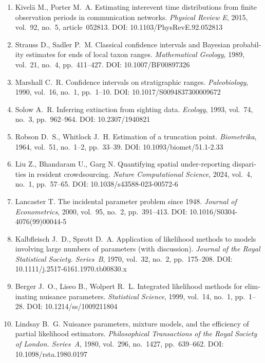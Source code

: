 \documentclass[11pt,a4paper]{article}
\theoremstyle{plain}
\theoremstyle{remark}
\begin{document}
\begin{otherlanguage}{english}
\begin{enumerate}
\item Kivel\"{a} M., Porter M.~A. Estimating interevent time distributions
from finite observation periods in communication networks.
\emph{Physical Review E}, 2015, vol.~92, no.~5, article~052813.
DOI: 10.1103/PhysRevE.92.052813

\item Strauss D., Sadler P.~M. Classical confidence intervals and Bayesian
probability estimates for ends of local taxon ranges. \emph{Mathematical
Geology}, 1989, vol.~21, no.~4, pp.~411--427. DOI: 10.1007/BF00897326

\item Marshall C.~R. Confidence intervals on stratigraphic ranges.
\emph{Paleobiology}, 1990, vol.~16, no.~1, pp.~1--10.
DOI: 10.1017/S0094837300009672

\item Solow A.~R. Inferring extinction from sighting data. \emph{Ecology},
1993, vol.~74, no.~3, pp.~962--964. DOI: 10.2307/1940821

\item Robson D.~S., Whitlock J.~H. Estimation of a truncation point.
\emph{Biometrika}, 1964, vol.~51, no.~1--2, pp.~33--39.
DOI: 10.1093/biomet/51.1-2.33

\item Liu Z., Bhandaram U., Garg N. Quantifying spatial under-reporting
disparities in resident crowdsourcing. \emph{Nature Computational Science},
2024, vol.~4, no.~1, pp.~57--65. DOI: 10.1038/s43588-023-00572-6

\item Lancaster T. The incidental parameter problem since 1948. \emph{Journal
of Econometrics}, 2000, vol.~95, no.~2, pp.~391--413.
DOI: 10.1016/S0304-4076(99)00044-5

\item Kalbfleisch J.~D., Sprott D.~A. Application of likelihood methods to
models involving large numbers of parameters (with discussion). \emph{Journal
of the Royal Statistical Society. Series~B}, 1970, vol.~32, no.~2,
pp.~175--208. DOI: 10.1111/j.2517-6161.1970.tb00830.x

\item Berger J.~O., Liseo B., Wolpert R.~L. Integrated likelihood methods for
eliminating nuisance parameters. \emph{Statistical Science}, 1999, vol.~14,
no.~1, pp.~1--28. DOI: 10.1214/ss/1009211804

\item Lindsay B.~G. Nuisance parameters, mixture models, and the efficiency of
partial likelihood estimators. \emph{Philosophical Transactions of the Royal
Society of London. Series~A}, 1980, vol.~296, no.~1427, pp.~639--662.
DOI: 10.1098/rsta.1980.0197


\end{enumerate}
\end{otherlanguage}
\end{document}
